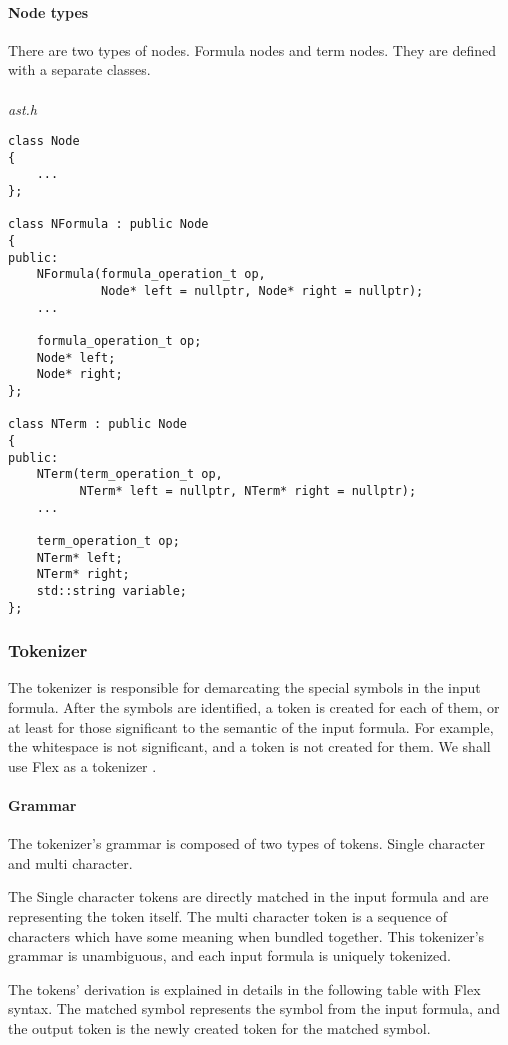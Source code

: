 \documentclass{article}
\begin{document}
	\newpage
	\paragraph{Node types} There are two types of nodes. Formula nodes and term nodes. They are defined with a separate classes.
	\\
	\\
\noindent
\textit{ast.h}
	\begin{lstlisting}
class Node
{
    ...
};

class NFormula : public Node
{
public:
    NFormula(formula_operation_t op,
             Node* left = nullptr, Node* right = nullptr);
    ...

    formula_operation_t op;
    Node* left;
    Node* right;
};

class NTerm : public Node
{
public:
    NTerm(term_operation_t op,
          NTerm* left = nullptr, NTerm* right = nullptr);
    ...

    term_operation_t op;
    NTerm* left;
    NTerm* right;
    std::string variable;
};
	\end{lstlisting}

	\subsubsection{Tokenizer}
	The tokenizer is responsible for demarcating the special symbols in the input formula.
	After the symbols are identified, a token is created for each of them, or at least for those significant to the semantic of the input formula.
	For example, the whitespace is not significant, and a token is not created for them.
	We shall use Flex as a tokenizer \cite{flex-tokenizer}.

	\paragraph{Grammar} The tokenizer's grammar is composed of two types of tokens. Single character and multi character.

	The Single character tokens are directly matched in the input formula and are representing the token itself.
	The multi character token is a sequence of characters which have some meaning when bundled together.
	This tokenizer's grammar is unambiguous, and each input formula is uniquely tokenized.

	The tokens' derivation is explained in details in the following table with Flex syntax. The matched symbol represents the symbol from the input formula, and the output token is the newly created token for the matched symbol.
\end{document}
